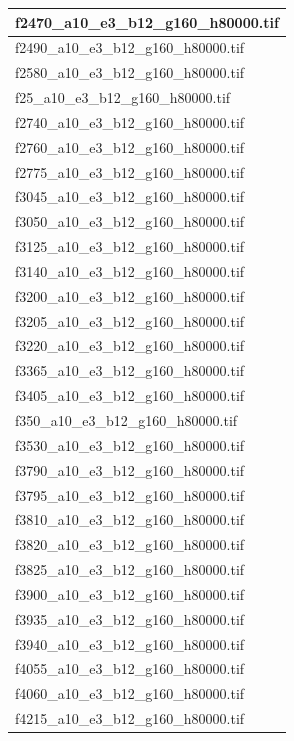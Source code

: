 \documentclass[12pt, twoside]{article}
\begin{document}
\begin{appendices}
\begin{longtable}{|l|}
			f2470\_a10\_e3\_b12\_g160\_h80000.tif \\ \hline 
			f2490\_a10\_e3\_b12\_g160\_h80000.tif \\ \hline 
			f2580\_a10\_e3\_b12\_g160\_h80000.tif \\ \hline 
			f25\_a10\_e3\_b12\_g160\_h80000.tif \\ \hline 
			f2740\_a10\_e3\_b12\_g160\_h80000.tif \\ \hline 
			f2760\_a10\_e3\_b12\_g160\_h80000.tif \\ \hline 
			f2775\_a10\_e3\_b12\_g160\_h80000.tif \\ \hline 
			f3045\_a10\_e3\_b12\_g160\_h80000.tif \\ \hline 
			f3050\_a10\_e3\_b12\_g160\_h80000.tif \\ \hline 
			f3125\_a10\_e3\_b12\_g160\_h80000.tif \\ \hline 
			f3140\_a10\_e3\_b12\_g160\_h80000.tif \\ \hline 
			f3200\_a10\_e3\_b12\_g160\_h80000.tif \\ \hline 
			f3205\_a10\_e3\_b12\_g160\_h80000.tif \\ \hline 
			f3220\_a10\_e3\_b12\_g160\_h80000.tif \\ \hline 
			f3365\_a10\_e3\_b12\_g160\_h80000.tif \\ \hline 
			f3405\_a10\_e3\_b12\_g160\_h80000.tif \\ \hline 
			f350\_a10\_e3\_b12\_g160\_h80000.tif \\ \hline 
			f3530\_a10\_e3\_b12\_g160\_h80000.tif \\ \hline 
			f3790\_a10\_e3\_b12\_g160\_h80000.tif \\ \hline 
			f3795\_a10\_e3\_b12\_g160\_h80000.tif \\ \hline 
			f3810\_a10\_e3\_b12\_g160\_h80000.tif \\ \hline 
			f3820\_a10\_e3\_b12\_g160\_h80000.tif \\ \hline 
			f3825\_a10\_e3\_b12\_g160\_h80000.tif \\ \hline 
			f3900\_a10\_e3\_b12\_g160\_h80000.tif \\ \hline 
			f3935\_a10\_e3\_b12\_g160\_h80000.tif \\ \hline 
			f3940\_a10\_e3\_b12\_g160\_h80000.tif \\ \hline 
			f4055\_a10\_e3\_b12\_g160\_h80000.tif \\ \hline 
			f4060\_a10\_e3\_b12\_g160\_h80000.tif \\ \hline 
			f4215\_a10\_e3\_b12\_g160\_h80000.tif \\ \hline 

\end{longtable}
\end{appendices}
\end{document}
